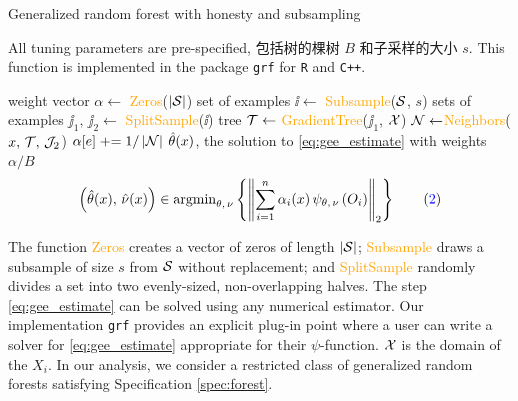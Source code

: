 \documentclass[aos]{imsart}
\theoremstyle{plain}
\theoremstyle{definition}
\theoremstyle{remark}
\begin{document}
\begin{CJK}{UTF8}{gbsn}
\begin{algorithm}[t]
\caption{Generalized random forest with honesty and subsampling}\label{alg:forest}
\vspace{-0.4\baselineskip}
\justify
All tuning parameters are pre-specified, 包括树的棵树 $B$ 和子采样的大小 $s$. This function is implemented in the package \texttt{grf}
for \texttt{R} and \texttt{C++}.
\begin{algorithmic}[1]
\State weight vector $\alpha \gets$ \textcolor{orange}{Zeros}{($\left\lvert\mathcal{S}\right\rvert$)}
\State set of examples $\ii \gets$ \textcolor{orange}{Subsample}{($\mathcal{S}$, $s$)}
\State sets of examples $\jj_1, \, \jj_2 \gets$ \textcolor{orange}{SplitSample}{($\ii$)}
\State tree $\mathcal{T} \gets$ \textcolor{orange}{GradientTree}{($\jj_1$, $\mathcal{X}$)}
\State $\mathcal{N} \gets $\textcolor{orange}{Neighbors}{($x, \, \mathcal{T}, \, \mathcal{J}_2$)} 
\State $\alpha[{e}] \mathrel{+}= 1/\left\lvert\mathcal{N}\right\rvert$ 
\EndFor
\EndFor
{} $\hat{\theta}(x)$, the solution to \eqref{eq:gee_estimate} with weights $\alpha/B$
\begin{equation*}
    \p{\htheta(x), \, \hnu(x)} \in \argmin_{\theta, \, \nu} \cb{\Norm{\sum_{i = 1}^n \alpha_i(x) \, \psi_{\theta, \, \nu}\p{O_i}}_2} \qquad ({\color{blue}{2}})
\end{equation*}
\EndProcedure
\end{algorithmic}
\justify
The function \textcolor{orange}{Zeros} creates a vector of zeros of length $\left\lvert\mathcal{S}\right\rvert$;
\textcolor{orange}{Subsample} draws a subsample of size $s$ from $\mathcal{S}$ without replacement; and
\textcolor{orange}{SplitSample} randomly divides a set into two evenly-sized, non-overlapping halves.
The step \eqref{eq:gee_estimate} can be solved using any numerical estimator.
Our implementation \texttt{grf} provides an explicit plug-in point where a user can write
a solver for \eqref{eq:gee_estimate} appropriate for their $\psi$-function.
$\mathcal{X}$ is the domain of the $X_i$.
In our analysis, we consider a restricted class of generalized random forests satisfying
Specification \ref{spec:forest}.
\end{algorithm}


\newcommand{\qset}{\mathcal{Q}}


\end{CJK}
\end{document}
